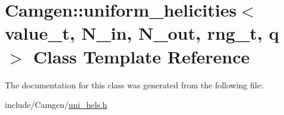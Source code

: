 \hypertarget{a00561}{}\section{Camgen\+:\+:uniform\+\_\+helicities$<$ value\+\_\+t, N\+\_\+in, N\+\_\+out, rng\+\_\+t, q $>$ Class Template Reference}
\label{a00561}


The documentation for this class was generated from the following file\+:\begin{DoxyCompactItemize}
\item 
include/\+Camgen/\hyperlink{a00820}{uni\+\_\+hels.\+h}\end{DoxyCompactItemize}
